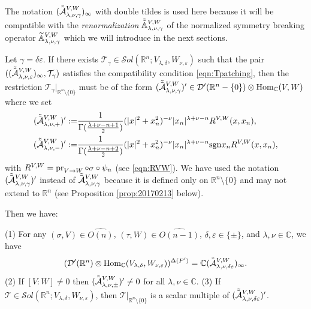 \begin{remark}
The notation $(\tilde{\tilde{{\mathcal{A}}}}_{{\lambda},{\nu},{\gamma}}^{{V,W}})_{\infty}$
 with double tildes
 is used here
 because it will be compatible
 with the 
{\it{renormalization}}
 $\tilde{\tilde{{\mathbb{A}}}}_{{\lambda},{\nu},{\gamma}}^{{V,W}}$
 of the normalized symmetry breaking operator
 ${\widetilde{\mathbb{A}}}_{{\lambda},{\nu},{\gamma}}^{{V,W}}$
 which we will introduce 
 in the next sections.  
\end{remark}



Let $\gamma=\delta \varepsilon$.  
If there exists 
$
   {\mathcal {T}}_{\gamma} 
   \in 
   {\mathcal{S}}ol({\mathbb{R}}^n;V_{\lambda,\delta}, W_{\nu,\varepsilon})
$
 such that the pair 
 $((\tilde{\tilde{{\mathcal{A}}}}_{{\lambda},{\nu},{\varepsilon}}^{{V,W}})_{\infty}, {\mathcal{T}}_{\gamma})$
 satisfies the compatibility condition \eqref{eqn:Tpatching},  
 then the restriction ${\mathcal{T}}_{\gamma}|_{{\mathbb{R}}^n \setminus \{0\}}$
 must be of the form 
$
(\tilde{\tilde{{\mathcal{A}}}}_{{\lambda},{\nu},{\gamma}}^{{V,W}})' \in 
 {\mathcal{D}}'({\mathbb{R}}^n - \{0\}) \otimes {\operatorname{Hom}}_{\mathbb{C}}(V,W)
$
where we set 
\begin{align}
(\tilde{\tilde{{\mathcal{A}}}}_{{\lambda},{\nu},{+}}^{{V,W}})'
 :=&
\frac{1}{\Gamma(\frac{\lambda + \nu-n+1}{2})}
         (|x|^2+ x_n^2)^{-\nu}
|x_n|^{\lambda+\nu-n}
R^{{V},{W}} (x,x_n), 
\label{eqn:AVW+}
\\
(\tilde{\tilde{{\mathcal{A}}}}_{{\lambda},{\nu},{-}}^{{V,W}})'
 :=&
\frac{1}{\Gamma(\frac{\lambda+\nu-n+2}{2})}
         (|x|^2 +x_n^2)^{-\nu}
|x_n|^{\lambda+\nu-n}
 {\operatorname{sgn}} x_n
R^{{V},{W}} (x,x_n), 
\label{eqn:AVW-}
\end{align}
with $R^{{V},{W}} = \operatorname{pr}_{{V}\to{W}} \circ \sigma \circ \psi_n$
 (see \eqref{eqn:RVW}).  
We have used the notation
$
   (\tilde{\tilde{{\mathcal{A}}}}_{{\lambda},{\nu},{\gamma}}^{{V,W}})'
$
 instead of 
$
   \tilde{\tilde{{\mathcal{A}}}}_{{\lambda},{\nu},{\gamma}}^{{V,W}}
$
 because it is defined 
 only on ${\mathbb{R}}^n \setminus \{0\}$
 and may not extend to ${\mathbb{R}}^n$
 (see Proposition \ref{prop:20170213} below).  


Then we have:
\begin{proposition}
\label{prop:20150828-1231}
{\rm{(1)}}\enspace
For any $(\sigma,V) \in \widehat{O(n)}$, 
 $(\tau,W) \in \widehat{O(n-1)}$,
 $\delta, \varepsilon \in \{ \pm \}$, 
 and $\lambda, \nu \in {\mathbb{C}}$, 
 we have
\[
({\mathcal{D}}'({\mathbb{R}}^n)
   \otimes 
   \operatorname{Hom}_{\mathbb{C}} (V_{\lambda,\delta}, W_{\nu, \varepsilon}))
^{\Delta(P')}
=
 {\mathbb{C}}(\tilde{\tilde{{\mathcal{A}}}}_{{\lambda},{\nu},{\delta\varepsilon}}^{{V,W}})_{\infty}.  
\]
\newline
{\rm{(2)}}\enspace
If $[V:W] \ne 0$
 then 
 $(\tilde{\tilde{{\mathcal{A}}}}_{{\lambda},{\nu},{\pm}}^{{V,W}})' \ne 0$
 for all $\lambda, \nu \in {\mathbb{C}}$.  
\newline
{\rm{(3)}}\enspace
If ${\mathcal{T}} \in {\mathcal{S}}ol({\mathbb{R}}^n;V_{\lambda,\delta}, W_{\nu, \varepsilon})$, 
 then ${\mathcal{T}}|_{{\mathbb{R}}^n \setminus \{0\}}$ is a scalar multiple
 of $(\tilde{\tilde{{\mathcal{A}}}}_{{\lambda},{\nu},{\delta \varepsilon}}^{{V,W}})'$.  
\end{proposition}

